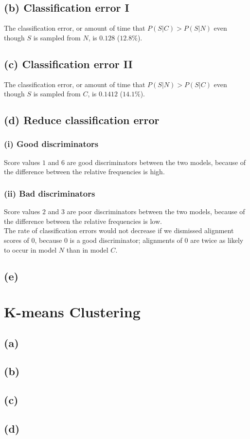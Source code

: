 \documentclass[12pt]{article}
\begin{document}
\subsection*{(b) Classification error I}
The classification error, or amount of time that $P(S | C) > P(S | N)$
even though $S$ is sampled from $N$, is $0.128$ ($12.8\%$).

\subsection*{(c) Classification error II}
The classification error, or amount of time that $P(S | N) > P(S | C)$
even though $S$ is sampled from $C$, is $0.1412$ ($14.1\%$).

\subsection*{(d) Reduce classification error}
\subsubsection*{(i) Good discriminators}
Score values $1$ and $6$ are good discriminators between the two models,
because of the difference between the relative frequencies is high.

\subsubsection*{(ii) Bad discriminators}
Score values $2$ and $3$ are poor discriminators between the two models,
because of the difference between the relative frequencies is low.\\

The rate of classification errors would not decrease if
we dismissed alignment scores of $0$, because
$0$ is a good discriminator; alignments of $0$
are twice as likely to occur in model $N$ than in
model $C$.

\subsection*{(e)}

\section{K-means Clustering}
\subsection*{(a)}
\subsection*{(b)}
\subsection*{(c)}
\subsection*{(d)}
\end{document}
